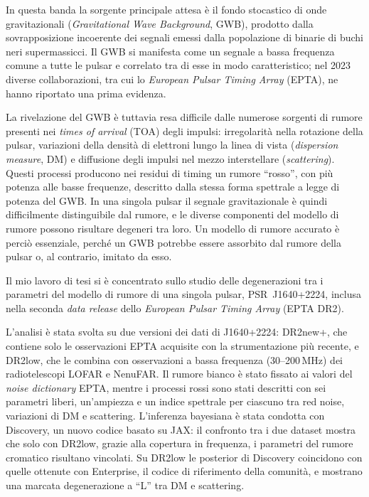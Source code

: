 \documentclass[12pt]{report}
\begin{document}
In questa banda la sorgente principale attesa è il fondo stocastico di onde
gravitazionali (\textit{Gravitational Wave Background}, GWB), prodotto dalla
sovrapposizione incoerente dei segnali emessi dalla popolazione di binarie di buchi
neri supermassicci. Il GWB si manifesta come un segnale a bassa frequenza comune a
tutte le pulsar e correlato tra di esse in modo caratteristico; nel 2023 diverse
collaborazioni, tra cui lo \textit{European Pulsar Timing Array} (EPTA), ne hanno
riportato una prima evidenza. \par 

La rivelazione del GWB è tuttavia resa difficile dalle numerose sorgenti di rumore
presenti nei \textit{times of arrival} (TOA) degli impulsi: irregolarità nella
rotazione della pulsar, variazioni della densità di elettroni lungo la linea di
vista (\textit{dispersion measure}, DM) e diffusione degli impulsi nel mezzo
interstellare (\textit{scattering}). Questi processi producono nei residui di
timing un rumore ``rosso'', con più potenza alle basse frequenze, descritto dalla
stessa forma spettrale a legge di potenza del GWB. In una singola pulsar il
segnale gravitazionale è quindi difficilmente distinguibile dal rumore, e le
diverse componenti del modello di rumore possono risultare degeneri tra loro.
Un modello di rumore accurato è perciò essenziale, perché un GWB potrebbe essere
assorbito dal rumore della pulsar o, al contrario, imitato da esso. \par

Il mio lavoro di tesi si è concentrato sullo studio delle degenerazioni tra i
parametri del modello di rumore di una singola pulsar, PSR~J1640+2224, inclusa
nella seconda \textit{data release} dello \textit{European Pulsar Timing Array}
(EPTA DR2). \par 

L'analisi è stata svolta su due versioni dei dati di J1640+2224: DR2new+, che
contiene solo le osservazioni EPTA acquisite con la strumentazione più recente,
e DR2low, che le combina con osservazioni a bassa frequenza (30--200\,MHz) dei
radiotelescopi LOFAR e NenuFAR. Il rumore bianco è stato fissato ai valori
del \textit{noise dictionary} EPTA, mentre i processi rossi sono stati descritti
con sei parametri liberi, un'ampiezza e un indice spettrale per ciascuno tra
red noise, variazioni di DM e scattering. L'inferenza bayesiana è stata
condotta con Discovery, un nuovo codice basato su JAX: il confronto tra i due
dataset mostra che solo con DR2low, grazie alla copertura in frequenza, i
parametri del rumore cromatico risultano vincolati. Su DR2low le posterior di
Discovery coincidono con quelle ottenute con Enterprise, il codice di
riferimento della comunità, e mostrano una marcata degenerazione a ``L'' tra DM
e scattering. \par
\end{document}
